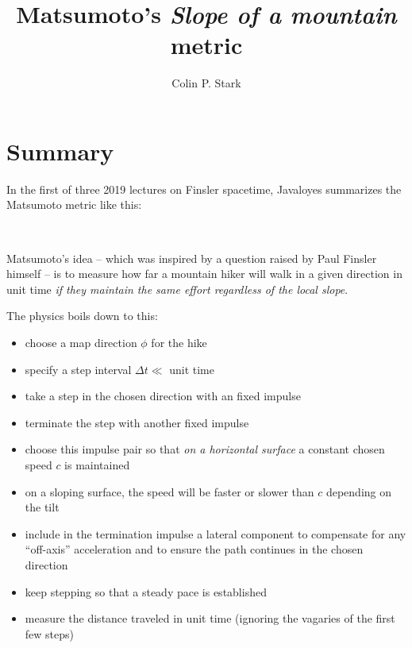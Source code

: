 \documentclass[11pt]{article}
\title{Matsumoto's \textit{Slope of a mountain} metric}
\author{Colin P. Stark}
\providecommand{\tightlist}{%
      \setlength{\itemsep}{0pt}\setlength{\parskip}{0pt}}
\begin{document}
    
    \maketitle
    
    

    
    \hypertarget{summary}{%
\section*{Summary}\label{summary}}


    In the first of three 2019 lectures on Finsler spacetime, Javaloyes
summarizes the Matsumoto metric like this:

 
            
    
    \begin{center}
    \end{center}
    { \hspace*{\fill} \\}
    

    Matsumoto's idea -- which was inspired by a question raised by Paul
Finsler himself -- is to measure how far a mountain hiker will walk in a
given direction in unit time \emph{if they maintain the same effort
regardless of the local slope}.

The physics boils down to this:

\begin{itemize}
\tightlist
\item
  choose a map direction \(\phi\) for the hike
\item
  specify a step interval \(\Delta{t} \ll {}\) unit time
\item
  take a step in the chosen direction with an fixed impulse
\item
  terminate the step with another fixed impulse
\item
  choose this impulse pair so that \emph{on a horizontal surface} a
  constant chosen speed \(c\) is maintained
\item
  on a sloping surface, the speed will be faster or slower than \(c\)
  depending on the tilt
\item
  include in the termination impulse a lateral component to compensate
  for any ``off-axis'' acceleration and to ensure the path continues in
  the chosen direction
\item
  keep stepping so that a steady pace is established
\item
  measure the distance traveled in unit time (ignoring the vagaries of
  the first few steps)
\end{itemize}
\end{document}
